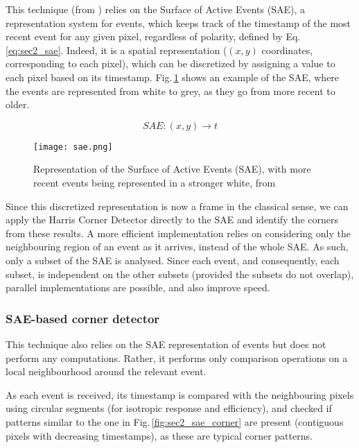 This technique (from \cite{vasco2016fast}) relies on the Surface of Active Events (SAE), a representation system for events, which keeps track of the timestamp of the most recent event for any given pixel, regardless of polarity, defined by Eq.\,\ref{eq:sec2_sae}. Indeed, it is a spatial representation ($(x,y)$ coordinates, corresponding to each pixel), which can be discretized by assigning a value to each pixel based on its timestamp. Fig.\,\ref{fig:sec2_sae} shows an example of the SAE, where the events are represented from white to grey, as they go from more recent to older.

\printglossaries


\begin{equation}
    \label{eq:sec2_sae}
    SAE:(x,y) \to t
\end{equation}

\begin{figure}[ht]
    \centering
    \texttt{[image: sae.png]}
    \caption[Representation of the Surface of Active Events (SAE)]{Representation of the Surface of Active Events (SAE), with more recent events being represented in a stronger white, from \cite{mueggler2017fast}}
    \label{fig:sec2_sae}
\end{figure}

Since this discretized representation is now a frame in the classical sense, we can apply the Harris Corner Detector directly to the SAE and identify the corners from these results. 
A more efficient implementation relies on considering only the neighbouring region of an event as it arrives, instead of the whole SAE. As such, only a subset of the SAE is analysed. Since each event, and consequently, each subset, is independent on the other subsets (provided the subsets do not overlap), parallel implementations are possible, and also improve speed.

\subsubsection{SAE-based corner detector}
\label{sec:sec2_sae_corner_detection}


This technique also relies on the SAE representation of events but does not perform any computations. Rather, it performs only comparison operations on a local neighbourhood around the relevant event.

As each event is received, its timestamp is compared with the neighbouring pixels using circular segments (for isotropic response and efficiency), and checked if patterns similar to the one in Fig.\,\ref{fig:sec2_sae_corner} are present (contiguous pixels with decreasing timestamps), as these are typical corner patterns.

